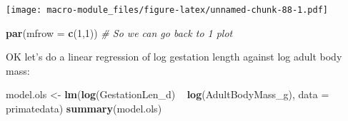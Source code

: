 \documentclass[]{book}
\newenvironment{Shaded}{\begin{snugshade}}{\end{snugshade}}
\newcommand{\KeywordTok}[1]{\textcolor[rgb]{0.13,0.29,0.53}{\textbf{{#1}}}}
\newcommand{\DataTypeTok}[1]{\textcolor[rgb]{0.13,0.29,0.53}{{#1}}}
\newcommand{\DecValTok}[1]{\textcolor[rgb]{0.00,0.00,0.81}{{#1}}}
\newcommand{\StringTok}[1]{\textcolor[rgb]{0.31,0.60,0.02}{{#1}}}
\newcommand{\CommentTok}[1]{\textcolor[rgb]{0.56,0.35,0.01}{\textit{{#1}}}}
\newcommand{\NormalTok}[1]{{#1}}
\begin{document}
\begin{Shaded}
\end{Shaded}

\texttt{[image: macro-module\_files/figure-latex/unnamed-chunk-88-1.pdf]}

\begin{Shaded}
\begin{Highlighting}[]
\KeywordTok{par}\NormalTok{(}\DataTypeTok{mfrow =} \KeywordTok{c}\NormalTok{(}\DecValTok{1}\NormalTok{,}\DecValTok{1}\NormalTok{)) }\CommentTok{# So we can go back to 1 plot}
\end{Highlighting}
\end{Shaded}

OK let's do a linear regression of log gestation length against log
adult body mass:

\begin{Shaded}
\begin{Highlighting}[]
\NormalTok{model.ols <-}\StringTok{ }\KeywordTok{lm}\NormalTok{(}\KeywordTok{log}\NormalTok{(GestationLen_d) ~}\StringTok{ }\KeywordTok{log}\NormalTok{(AdultBodyMass_g), }\DataTypeTok{data =} \NormalTok{primatedata)}
\KeywordTok{summary}\NormalTok{(model.ols)}
\end{Highlighting}
\end{Shaded}
\end{document}

